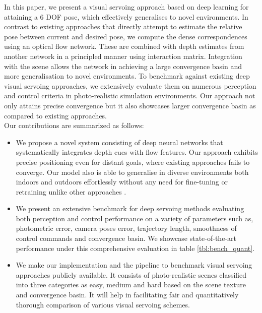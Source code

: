 \documentclass[letterpaper, 10 pt, conference]{ieeeconf}  %
\begin{document}
\indent In this paper, we present a visual servoing approach based on deep learning for attaining a 6 DOF pose, which effectively generalises to novel environments. In contrast to existing approaches that directly attempt to estimate the relative pose between current and desired pose, we compute the dense correspondences using an optical flow network. These are combined with depth estimates from another network in a principled manner using interaction matrix. Integration with the scene
allows the network in achieving a large convergence basin and more generalisation to novel environments. To benchmark against existing deep visual servoing approaches, we extensively evaluate them on numerous perception and control criteria in photo-realistic simulation environments. Our approach not only attains precise convergence but it  also showcases larger convergence basin as compared to existing approaches. \\                   


Our contributions are summarized as follows:
\begin{itemize}

    \item We propose a novel system consisting of deep neural networks that systematically integrates depth cues with flow features. Our approach exhibits precise positioning even for distant goals, where existing approaches fails to converge. Our model also is able to generalise in diverse environments both indoors and outdoors effortlessly without any need for fine-tuning or retraining unlike other approaches \cite{targetdriven}.
    
    \item We present an extensive benchmark for deep servoing methods evaluating both perception and control performance on a variety of parameters such as, photometric error, camera poses error, trajectory length, smoothness of control commands and convergence basin. We showcase state-of-the-art performance under this comprehensive evaluation in table \ref{tbl:bench_quant}.
    
    \item We make our implementation and the pipeline to benchmark visual servoing approaches publicly available. It consists of photo-realistic scenes classified into three categories as easy, medium and hard based on the scene texture and convergence basin. It will help in facilitating fair and quantitatively thorough comparison of various visual servoing schemes. 

\end{itemize}
\end{document}
